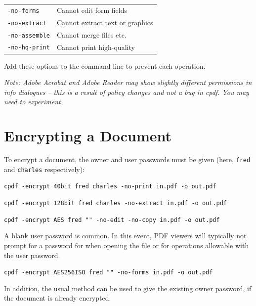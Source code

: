 \documentclass{book}
\begin{document}
   \vspace{2mm}
   \begin{tabular}{ll}
     \texttt{-no-forms} & Cannot edit form fields\\
     \texttt{-no-extract} & Cannot extract text or graphics\\
     \texttt{-no-assemble} & Cannot merge files etc.\\
     \texttt{-no-hq-print} & Cannot print high-quality\\
   \end{tabular}

  \vspace{2mm}
  \noindent Add these options to the command line to prevent each operation.

  \vspace{2mm}
\noindent\textit{Note: Adobe Acrobat and Adobe Reader may show slightly different permissions in info dialogues -- this is a result of policy changes and not a bug in \textup{cpdf}. You may need to experiment.}

  \vspace{2mm}

  \section{Encrypting a Document}
  To encrypt a document, the owner and user passwords must be given (here, \texttt{fred} and \texttt{charles} respectively):
  \begin{framed}
    \noindent\small\verb!cpdf -encrypt 40bit fred charles -no-print in.pdf -o out.pdf!

    \vspace{1.5mm}
    \noindent\small\verb!cpdf -encrypt 128bit fred charles -no-extract in.pdf -o out.pdf!

    \vspace{1.5mm}
    \noindent\small\verb!cpdf -encrypt AES fred "" -no-edit -no-copy in.pdf -o out.pdf!
  \end{framed}
  \noindent A blank user password is
common. In this event, PDF viewers will typically not prompt for a
password for when opening the file or for operations allowable with the user password.
  \begin{framed}
    \vspace{1.5mm}
    \noindent\small\verb!cpdf -encrypt AES256ISO fred "" -no-forms in.pdf -o out.pdf!
  \end{framed}
\noindent In addition, the usual method can be used to give the existing owner
password, if the document is already encrypted.
\end{document}
